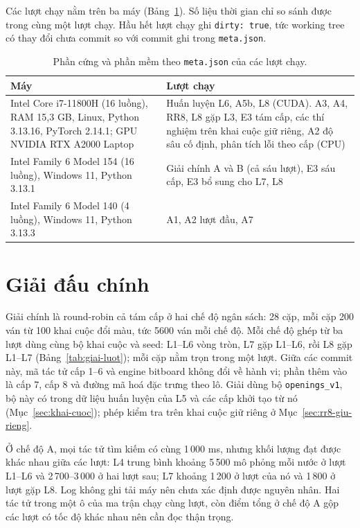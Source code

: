 Các lượt chạy nằm trên ba máy (Bảng~\ref{tab:phan-cung}). Số liệu thời gian chỉ so sánh được trong cùng một lượt chạy. Hầu hết lượt chạy ghi \texttt{dirty: true}, tức working tree có thay đổi chưa commit so với commit ghi trong \texttt{meta.json}.

\begin{table}[H]
\centering\footnotesize
\caption{Phần cứng và phần mềm theo \texttt{meta.json} của các lượt chạy.}
\label{tab:phan-cung}
\begin{tabularx}{\textwidth}{@{}>{\raggedright\arraybackslash}p{} >{\raggedright\arraybackslash}X@{}}
\toprule
\textbf{Máy} & \textbf{Lượt chạy} \\
\midrule
Intel Core i7-11800H (16 luồng), RAM 15{,}3 GB, Linux, Python 3.13.16, PyTorch 2.14.1; GPU NVIDIA RTX A2000 Laptop & Huấn luyện L6, A5b, L8 (CUDA). A3, A4, RR8, L8 gặp L3, E3 tám cấp, các thí nghiệm trên khai cuộc giữ riêng, A2 độ sâu cố định, phân tích lỗi theo cấp (CPU) \\
Intel Family 6 Model 154 (16 luồng), Windows 11, Python 3.13.1 & Giải chính A và B (cả sáu lượt), E3 sáu cấp, E3 bổ sung cho L7, L8 \\
Intel Family 6 Model 140 (4 luồng), Windows 11, Python 3.13.3 & A1, A2 lượt đầu, A7 \\
\bottomrule
\end{tabularx}
\end{table}

\section{Giải đấu chính}
Giải chính là round-robin cả tám cấp ở hai chế độ ngân sách: 28 cặp, mỗi cặp 200 ván từ 100 khai cuộc đổi màu, tức \num{5600} ván mỗi chế độ. Mỗi chế độ ghép từ ba lượt dùng cùng bộ khai cuộc và seed: L1--L6 vòng tròn, L7 gặp L1--L6, rồi L8 gặp L1--L7 (Bảng~\ref{tab:giai-luot}); mỗi cặp nằm trọn trong một lượt. Giữa các commit này, mã tác tử cấp 1--6 và engine bitboard không đổi về hành vi; phần thêm vào là cấp 7, cấp 8 và đường mã hoá đặc trưng theo lô. Giải dùng bộ \texttt{openings\_v1}, bộ này có trong dữ liệu huấn luyện của L5 và các cấp khởi tạo từ nó (Mục~\ref{sec:khai-cuoc}); phép kiểm tra trên khai cuộc giữ riêng ở Mục~\ref{sec:rr8-giu-rieng}.

Ở chế độ A, mọi tác tử tìm kiếm có cùng 1\,000 ms, nhưng khối lượng đạt được khác nhau giữa các lượt: L4 trung bình khoảng 5\,500 mô phỏng mỗi nước ở lượt L1--L6 và 2\,700--3\,000 ở hai lượt sau; L7 khoảng 1\,200 ở lượt của nó và 1\,800 ở lượt gặp L8. Log không ghi tải máy nên chưa xác định được nguyên nhân. Hai tác tử trong một ô của ma trận chạy cùng lượt, còn điểm tổng ở chế độ A gộp các lượt có tốc độ khác nhau nên cần đọc thận trọng.

